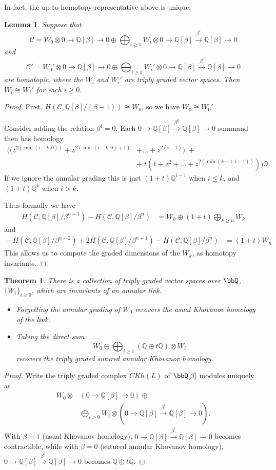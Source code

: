 \documentclass{amsart}
\theoremstyle{plain}
\newtheorem{thm}[prop]{Theorem}
\newtheorem{lem}[prop]{Lemma}
\newcommand{\complexzero}{0\rightarrow\mathbb Q [\beta]\rightarrow 0}
\newcommand{\complexk}[1]{0\rightarrow\mathbb Q [\beta]\xrightarrow{\beta^{#1}}{}\mathbb Q [\beta]\rightarrow 0}
\begin{document}
In fact, the up-to-homotopy representative above is unique.
\begin{lem}
Suppose that 
$$ \mathcal C = W_0 \otimes \complexzero \oplus \bigoplus_{i \geq 1} W_i \otimes \complexk{i} $$
and 
$$ \mathcal C' = W_0' \otimes \complexzero \oplus \bigoplus_{i \geq 1} W_i' \otimes \complexk{i} $$
are homotopic, where the $W_i$ and $W_i'$ are triply graded vector spaces.
Then $W_i \cong W_i'$ for each $i \geq 0$.
\end{lem}
\begin{proof}
First, $H(\mathcal C, \mathbb Q[\beta]/(\beta - 1)) \cong W_0$, so we have $W_0 \cong W_0'$.

Consider adding the relation $\beta^i = 0$. Each $\complexk{k}$ summand then has homology
\begin{align*}
\Big((z^{2(\min(i-k,0))} + z^{2(\min(i-k,0)+1)} & + ... + z^{2(i-1)}) \;+  \\
 &  + \;t(1 + z^2 + ... + z^{2(\min(k-1,i-1))})\Big)\mathbb Q.
\end{align*}
If we ignore the annular grading this is just
$(1+t) \mathbb Q^{i-1}$ when $i \leq k$, and $(1+t) \mathbb Q^k$ when $i > k$.

Thus formally we have
\begin{align*}
H(\mathcal C, \mathbb Q[\beta]/\beta^{n+1}) - H(\mathcal C, \mathbb Q[\beta]/\beta^n) & = W_0 \oplus (1+t) \bigoplus_{k \geq n} W_k
\end{align*}
and
\begin{align*}
- H(\mathcal C, \mathbb Q[\beta]/\beta^{n+2}) + 2 H(\mathcal C, \mathbb Q[\beta]/\beta^{n+1}) -  H(\mathcal C, \mathbb Q[\beta]/\beta^{n}) & = (1+t) W_n 
\end{align*}
This allows us
to compute the graded dimensions of the $W_k$, as homotopy invariants.
\end{proof}

\begin{thm}
There is a collection of triply graded vector spaces over $\bbQ$, $\{W_i\}_{i \geq 0}$, which are invariants of an annular link.
\begin{itemize}
\item Forgetting the annular grading of $W_0$ recovers the usual Khovanov homology of the link.
\item Taking the direct sum $$W_0 \oplus \bigoplus_{i \geq 1} (\mathbb Q \oplus t \mathbb Q) \otimes W_i$$ recovers the triply graded sutured annular Khovanov homology.
\end{itemize}
\end{thm}
\begin{proof}
Write the triply graded complex $CKh(L)$ of $\bbQ[\beta]$ modules uniquely as 
\begin{align*}
W_0 \otimes & \left(\complexzero\right) \oplus \\
            & \bigoplus_{i > 0} W_i \otimes \left( \complexk{i} \right).
\end{align*}
With $\beta = 1$ (usual Khovanov homology), $\complexk{i}$ becomes contractible, while with $\beta = 0$ (sutured annular Khovanov homology), $\complexk{i}$ becomes $\mathbb Q \oplus t \mathbb Q$.
\end{proof}
\end{document}
